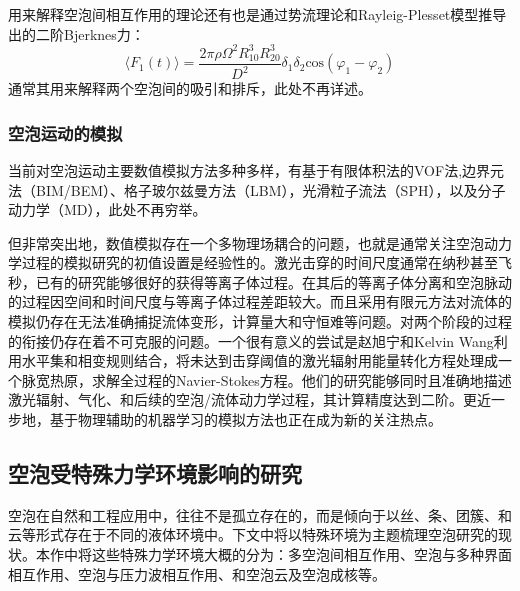 用来解释空泡间相互作用的理论还有也是通过势流理论和Rayleig-Plesset模型推导出的二阶Bjerknes力\cite{harkin_coupled_2001,mettin_bjerknes_1997}：
$$\langle F_1(t)\rangle=\dfrac{2\pi\rho\Omega^2R_{10}^3R_{20}^3}{D^2}\delta_1\delta_2\text{cos}(\varphi_1-\varphi_2)$$
通常其用来解释两个空泡间的吸引和排斥，此处不再详述。

\medskip
\bigskip
\subsubsection{空泡运动的模拟}

当前对空泡运动主要数值模拟方法多种多样，有基于有限体积法的VOF法\cite{lauterborn_bubble_2018,koch_numerical_2016},边界元法（BIM/BEM）\cite{klaseboer_simulations_2006,Kim2014}、格子玻尔兹曼方法（LBM）\cite{shi_numerical_2019,chen_experimental_2023,gupta_lattice_2008}，光滑粒子流法（SPH）\cite{zhang_sph-bem_2019,zhang_sph_2015,wang_axisymmetric_2022}，以及分子动力学（MD）\cite{shih_effect_2020}，此处不再穷举\cite{ohl_shockwave_2013}。

但非常突出地，数值模拟存在一个多物理场耦合的问题，也就是通常关注空泡动力学过程的模拟研究的初值设置是经验性的。激光击穿的时间尺度通常在纳秒甚至飞秒，已有的研究能够很好的获得等离子体过程\cite{zhang_transient_2016}。在其后的等离子体分离和空泡脉动的过程因空间和时间尺度与等离子体过程差距较大。而且采用有限元方法对流体的模拟仍存在无法准确捕捉流体变形，计算量大和守恒难等问题。对两个阶段的过程的衔接仍存在着不可克服的问题。一个很有意义的尝试是赵旭宁和Kelvin Wang利用水平集和相变规则结合，将未达到击穿阈值的激光辐射用能量转化方程处理成一个脉宽热原，求解全过程的Navier-Stokes方程\cite{zhao_simulating_2023}。他们的研究能够同时且准确地描述激光辐射、气化、和后续的空泡/流体动力学过程，其计算精度达到二阶。更近一步地，基于物理辅助的机器学习的模拟方法也正在成为新的关注热点\cite{wang_machine_2021,zhai_predicting_2022,zhai_bubblenet_2022}。


\subsection{空泡受特殊力学环境影响的研究}
空泡在自然和工程应用中，往往不是孤立存在的，而是倾向于以丝、条、团簇、和云等形式存在于不同的液体环境中。下文中将以特殊环境为主题梳理空泡研究的现状。本作中将这些特殊力学环境大概的分为：多空泡间相互作用、空泡与多种界面相互作用、空泡与压力波相互作用、和空泡云及空泡成核等。
\medskip
\bigskip
